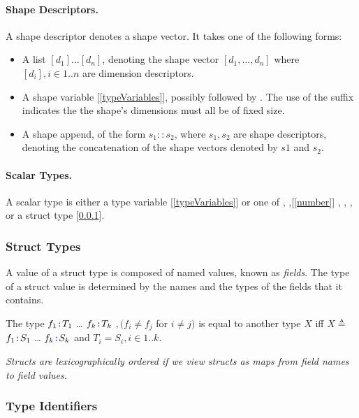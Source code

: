 \documentclass{article}
\begin{document}
\paragraph{Shape Descriptors.}
 A shape descriptor denotes a shape vector. It takes one of the following forms:
 \begin{itemize}
 \item  A list $[d_1] \ldots [d_n]$, denoting the shape vector $[d_1, \ldots, d_n]$ where $[d_i], i \in 1..n$ are dimension descriptors.
 \item A shape variable [\ref{typeVariables}], possibly followed by \BANG. The use of the \BANG{} suffix indicates the the shape's  dimensions must all be of fixed size. 
 \item A shape append, of the form $s_1 :: s_2$, where $s_1, s_2$ are shape descriptors, denoting the concatenation of the shape vectors denoted by $s1$ and $s_2$. 
 \end{itemize}
 
\paragraph{Scalar Types.}
 A scalar type is either a type variable [\ref{typeVariables}] or one of \BOOL [\ref{bool}],  \NUMBER,[\ref{number}] \INT, \FLOAT, \STRING [\ref{string}], or a struct type [\ref{structTypes}].

\subsubsection{Struct Types}
\label{structTypes}

A value of a struct type is composed of named values, known as {\em fields}. The type of a struct value is determined by the names and the types of the fields that it contains.

\StructType{}

\PropertySig{}

The type \LCURLY{}$f_1 \texttt{\color{blue} :}{} T_1$\COMMA{} \ldots\COMMA{}  $f_k \texttt{\color{blue} :}{} T_k$\RCURLY{} $, (f_i \ne f_j$ for $i \ne j)$ is equal to another type $X$ iff  $X \triangleq $ \LCURLY{}$f_1 \texttt{\color{blue} :}{} S_1$\COMMA{} \ldots\COMMA{}  $f_k \texttt{\color{blue} :}{} S_k$\RCURLY{} and $T_i = S_i, i \in 1..k$.


{\em
Structs are lexicographically ordered if we view structs as maps from field names to field values. 
}

\subsubsection{Type Identifiers}
\label{typeIdentifiers}
\end{document}
